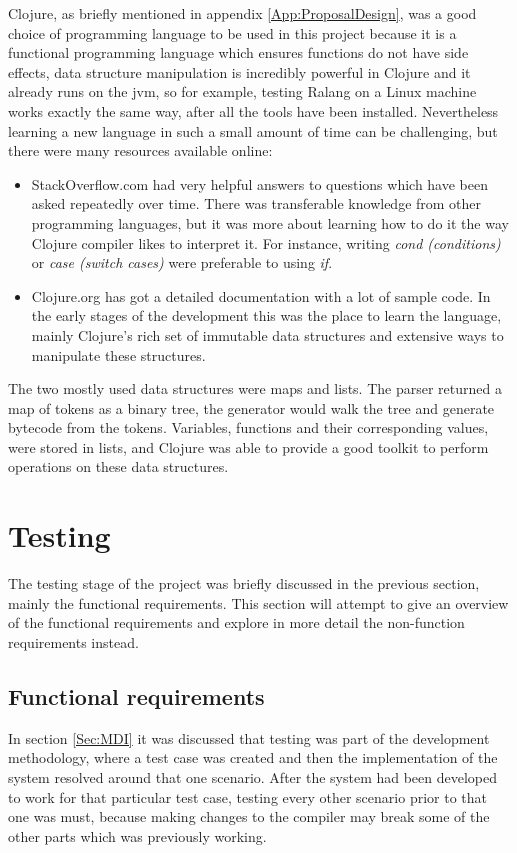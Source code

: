 \documentclass[a4paper]{article}
\begin{document}
	Clojure, as briefly mentioned in appendix  \ref{App:ProposalDesign}, was a good choice of programming language to be used in this project because it is a functional programming language which ensures functions do not have side effects, data structure manipulation is incredibly powerful in Clojure and it already runs on the \ac{jvm}, so for example, testing Ralang on a Linux machine works exactly the same way, after all the tools have been installed. Nevertheless learning a new language in such a small amount of time can be challenging, but there were many resources available online:
	\begin{itemize}
		\item StackOverflow.com had very helpful answers to questions which have been asked repeatedly over time. There was transferable knowledge from other programming languages, but it was more about learning how to do it the way Clojure compiler likes to interpret it. For instance, writing \textit{cond (conditions)} or \textit{case (switch cases)} were preferable to using \textit{if}.
		\item Clojure.org has got a detailed documentation with a lot of sample code. In the early stages of the development this was the place to learn the language, mainly Clojure's rich set of immutable data structures and extensive ways to manipulate these structures.
	\end{itemize}
	The two mostly used data structures were maps and lists. The parser returned a map of tokens as a binary tree, the generator would walk the tree and generate bytecode from the tokens. Variables, functions and their corresponding values, were stored in lists, and Clojure was able to provide a good toolkit to perform operations on these data structures.
	\newpage
	\section{Testing}
	\label{Sec:Test}
	The testing stage of the project was briefly discussed in the previous section, mainly the functional requirements. This section will attempt to give an overview of the functional requirements and explore in more detail the non-function requirements instead.
	\subsection{Functional requirements}
	In section \ref{Sec:MDI} it was discussed that testing was part of the development methodology, where a test case was created and then the implementation of the system resolved around that one scenario. After the system had been developed to work for that particular test case, testing every other scenario prior to that one was must, because making changes to the compiler may break some of the other parts which was previously working.\\
	
\end{document}
